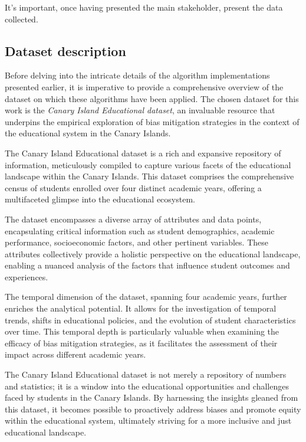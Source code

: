 \documentclass[12pt,a4paper,openright,twoside]{book}
\begin{document}
It's important, once having presented the main stakeholder, present the data collected.

\subsection{Dataset description}

Before delving into the intricate details of the algorithm implementations presented earlier, it is imperative to provide a comprehensive overview of the dataset on which these algorithms have been applied. The chosen dataset for this work is the \emph{Canary Island Educational dataset}, an invaluable resource that underpins the empirical exploration of bias mitigation strategies in the context of the educational system in the Canary Islands. 

The Canary Island Educational dataset is a rich and expansive repository of information, meticulously compiled to capture various facets of the educational landscape within the Canary Islands. This dataset comprises the comprehensive census of students enrolled over four distinct academic years, offering a multifaceted glimpse into the educational ecosystem. 

The dataset encompasses a diverse array of attributes and data points, encapsulating critical information such as student demographics, academic performance, socioeconomic factors, and other pertinent variables. These attributes collectively provide a holistic perspective on the educational landscape, enabling a nuanced analysis of the factors that influence student outcomes and experiences. 

The temporal dimension of the dataset, spanning four academic years, further enriches the analytical potential. It allows for the investigation of temporal trends, shifts in educational policies, and the evolution of student characteristics over time. This temporal depth is particularly valuable when examining the efficacy of bias mitigation strategies, as it facilitates the assessment of their impact across different academic years. 

The Canary Island Educational dataset is not merely a repository of numbers and statistics; it is a window into the educational opportunities and challenges faced by students in the Canary Islands. By harnessing the insights gleaned from this dataset, it becomes possible to proactively address biases and promote equity within the educational system, ultimately striving for a more inclusive and just educational landscape.
\end{document}
